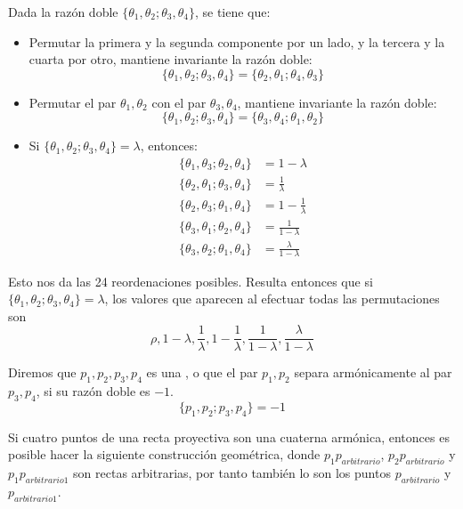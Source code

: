 Dada la razón doble $\{\theta_1,\theta_2;\theta_3,\theta_4\}$, se tiene que:
\begin{itemize}
	\item Permutar la primera y la segunda componente por un lado, y la tercera y la cuarta por otro, mantiene invariante la razón doble: \[\{\theta_1,\theta_2;\theta_3,\theta_4\}=\{\theta_2,\theta_1;\theta_4,\theta_3\}\]
	
	\item Permutar el par $\theta_1,\theta_2$ con el par $\theta_3,\theta_4$, mantiene invariante la razón doble: \[\{\theta_1,\theta_2;\theta_3,\theta_4\}=\{\theta_3,\theta_4;\theta_1,\theta_2\}\]
	
	\item Si $\{\theta_1,\theta_2;\theta_3,\theta_4\}=\lambda$, entonces:
	\begin{equation*}
		\begin{split}
			\{\theta_1,\theta_3;\theta_2,\theta_4\}&=1-\lambda\\
			\{\theta_2,\theta_1;\theta_3,\theta_4\}&=\frac{1}{\lambda}\\
			\{\theta_2,\theta_3;\theta_1,\theta_4\}&=1-\frac{1}{\lambda}\\
			\{\theta_3,\theta_1;\theta_2,\theta_4\}&=\frac{1}{1-\lambda}\\
			\{\theta_3,\theta_2;\theta_1,\theta_4\}&=\frac{\lambda}{1-\lambda}
		\end{split}
	\end{equation*}
\end{itemize}
Esto nos da las 24 reordenaciones posibles. Resulta entonces que si $\{\theta_1,\theta_2;\theta_3,\theta_4\}=\lambda$, los valores que aparecen al efectuar todas las permutaciones son 
\[\rho,1-\lambda,\frac{1}{\lambda},1-\frac{1}{\lambda},\frac{1}{1-\lambda},\frac{\lambda}{1-\lambda}\]
\begin{defi}
	Diremos que $p_1,p_2,p_3,p_4$ es una , o que el par $p_1,p_2$ separa armónicamente al par $p_3,p_4$, si su razón doble es $-1$.
	\begin{equation}
		\{p_1,p_2;p_3,p_4\}=-1
	\end{equation}
\end{defi}
Si cuatro puntos de una recta proyectiva son una cuaterna armónica, entonces es posible hacer la siguiente construcción geométrica, donde $p_1p_{arbitrario}$, $p_2p_{arbitrario}$ y $p_1p_{arbitrario1}$ son rectas arbitrarias, por tanto también lo son los puntos $p_{arbitrario}$ y $p_{arbitrario1}$.

